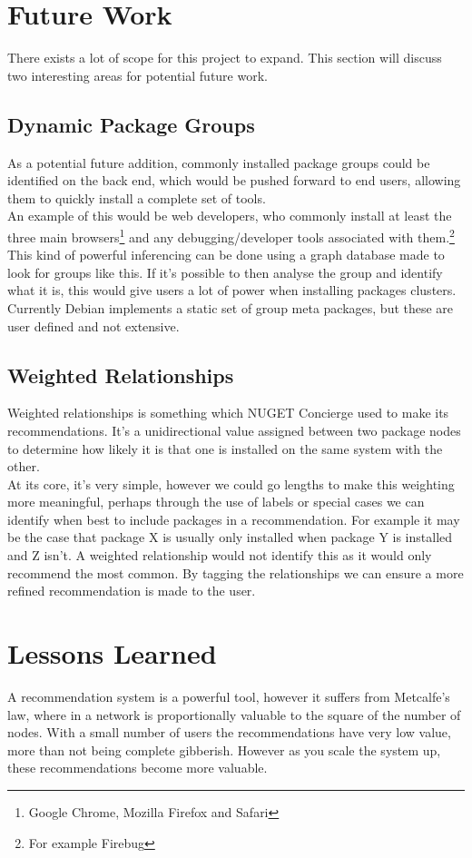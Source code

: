 \documentclass{l4proj}
\begin{document}
\section{Future Work}
There exists a lot of scope for this project to expand. This section will discuss two interesting areas for potential future work.

\subsection{Dynamic Package Groups}
As a potential future addition, commonly installed package groups could be identified on the back end, which would be pushed forward to end users, allowing them to quickly install a complete set of tools.\\
An example of this would be web developers, who commonly install at least the three main browsers\footnote{Google Chrome, Mozilla Firefox and Safari} and any debugging/developer tools associated with them.\footnote{For example Firebug}\\
This kind of powerful inferencing can be done using a graph database made to look for groups like this. If it's possible to then analyse the group and identify what it is, this would give users a lot of power when installing packages clusters. Currently Debian implements a static set of group meta packages, but these are user defined and not extensive.\\ 

\subsection{Weighted Relationships} 
Weighted relationships is something which NUGET Concierge used to make its recommendations. It's a unidirectional value assigned between two package nodes to determine how likely it is that one is installed on the same system with the other.\\
At its core, it's very simple, however we could go lengths to make this weighting more meaningful, perhaps through the use of labels or special cases we can identify when best to include packages in a recommendation. For example it may be the case that package X is usually only installed when package Y is installed and Z isn't. A weighted relationship would not identify this as it would only recommend the most common. By tagging the relationships we can ensure a more refined recommendation is made to the user.

\section{Lessons Learned}
A recommendation system is a powerful tool, however it suffers from Metcalfe's law\cite{law}, where in a network is proportionally valuable to the square of the number of nodes. With a small number of users the recommendations have very low value, more than not being complete gibberish. However as you scale the system up, these recommendations become more valuable.\\

 
 
 


\end{document}

